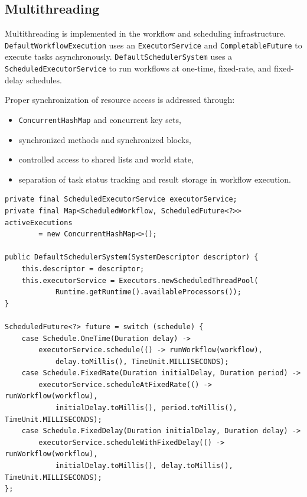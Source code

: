 \documentclass[12pt]{extarticle}
\begin{document}
\subsection{Multithreading}
Multithreading is implemented in the workflow and scheduling infrastructure. \texttt{DefaultWorkflowExecution} uses an \texttt{ExecutorService} and \texttt{CompletableFuture} to execute tasks asynchronously. \texttt{DefaultSchedulerSystem} uses a \texttt{ScheduledExecutorService} to run workflows at one-time, fixed-rate, and fixed-delay schedules.

Proper synchronization of resource access is addressed through:
\begin{itemize}[leftmargin=1.5em]
    \item \texttt{ConcurrentHashMap} and concurrent key sets,
    \item synchronized methods and synchronized blocks,
    \item controlled access to shared lists and world state,
    \item separation of task status tracking and result storage in workflow execution.
\end{itemize}

\begin{lstlisting}[caption={Executor-based multithreading in the scheduler system}]
private final ScheduledExecutorService executorService;
private final Map<ScheduledWorkflow, ScheduledFuture<?>> activeExecutions
        = new ConcurrentHashMap<>();

public DefaultSchedulerSystem(SystemDescriptor descriptor) {
    this.descriptor = descriptor;
    this.executorService = Executors.newScheduledThreadPool(
            Runtime.getRuntime().availableProcessors());
}

ScheduledFuture<?> future = switch (schedule) {
    case Schedule.OneTime(Duration delay) ->
        executorService.schedule(() -> runWorkflow(workflow),
            delay.toMillis(), TimeUnit.MILLISECONDS);
    case Schedule.FixedRate(Duration initialDelay, Duration period) ->
        executorService.scheduleAtFixedRate(() -> runWorkflow(workflow),
            initialDelay.toMillis(), period.toMillis(), TimeUnit.MILLISECONDS);
    case Schedule.FixedDelay(Duration initialDelay, Duration delay) ->
        executorService.scheduleWithFixedDelay(() -> runWorkflow(workflow),
            initialDelay.toMillis(), delay.toMillis(), TimeUnit.MILLISECONDS);
};
\end{lstlisting}
\end{document}
